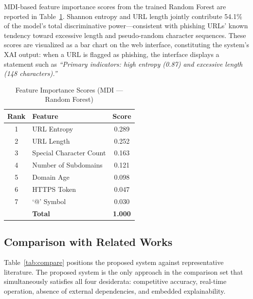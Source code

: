\documentclass[conference]{IEEEtran}
\begin{document}
MDI-based feature importance scores from the trained Random 
Forest are reported in Table~\ref{tab:fi}. Shannon entropy 
and URL length jointly contribute 54.1\% of the model's total 
discriminative power—consistent with phishing URLs' known 
tendency toward excessive length and pseudo-random character 
sequences. These scores are visualized as a bar chart on the 
web interface, constituting the system's XAI output: when a 
URL is flagged as phishing, the interface displays a statement 
such as \textit{``Primary indicators: high entropy (0.87) and 
excessive length (148 characters).''}

\begin{table}[htbp]
\caption{Feature Importance Scores (MDI --- Random Forest)}
\label{tab:fi}
\centering
\renewcommand{\arraystretch}{1.2}
\begin{tabular}{clc}
\toprule
\textbf{Rank} & \textbf{Feature}        & \textbf{Score} \\
\midrule
1 & URL Entropy              & 0.289 \\
2 & URL Length               & 0.252 \\
3 & Special Character Count  & 0.163 \\
4 & Number of Subdomains     & 0.121 \\
5 & Domain Age               & 0.098 \\
6 & HTTPS Token              & 0.047 \\
7 & `@' Symbol               & 0.030 \\
\midrule
  & \textbf{Total}           & \textbf{1.000} \\
\bottomrule
\end{tabular}
\end{table}

\subsection{Comparison with Related Works}

Table~\ref{tab:compare} positions the proposed system against 
representative literature. The proposed system is the only 
approach in the comparison set that simultaneously satisfies 
all four desiderata: competitive accuracy, real-time operation, 
absence of external dependencies, and embedded explainability.
\end{document}
